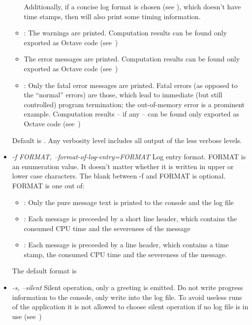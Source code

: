 \begin{itemize}
\begin{itemize}
        Additionally, if a concise log format is chosen (see ),
        which doesn't have time stamps, then  will also print
        some timing information.
        
      \item {}: The warnings are printed. Computation results can
        be found only exported as Octave code (see~)
        
      \item {} The error messages are printed. Computation
        results can be found only exported as Octave code (see~)
        
      \item {}: Only the fatal error messages are printed. Fatal
        errors (as opposed to the ``normal'' errors) are those, which lead
        to immediate (but still controlled) program termination; the
        out-of-memory error is a prominent example. Computation results --
        if any -- can be found only exported as Octave code (see~)
    \end{itemize}
    Default is . Any verbosity level includes all output of
    the less verbose levels.

  \item \emph{-f FORMAT, --format-of-log-entry=FORMAT}
    Log entry format. FORMAT is an enumeration value. It doesn't matter
    whether it is written in upper or lower case characters. The blank
    between -f and FORMAT is optional. FORMAT is one out of:
    \begin{itemize}
      \item {}: Only the pure message text is printed to the
        console and the log file
        
      \item {}: Each message is preceeded by a short line
        header, which contains the consumed CPU time and the severeness of
        the message
        
      \item {}: Each message is preceeded by a line header, which
        contains a time stamp, the consumed CPU time and the severeness of
        the message.
    \end{itemize}
    The default format is 

  \item \emph{-s, --silent}
    Silent operation, only a greeting is emitted. Do not write progress
    information to the console, only write into the log file. To avoid
    useless runs of the application it is not allowed to choose silent
    operation if no log file is in use (see~)
    

\end{itemize}
